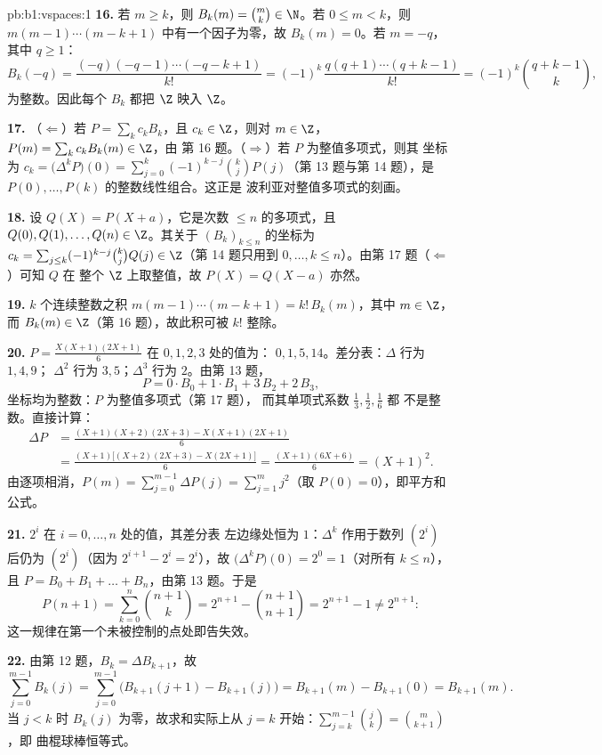 \begin{solution}{pb:b1:vspaces:1}
\textbf{16.} 若 $m \geq k$，则 $B_k(m) = \binom mk \in \N$。若 $0
\leq m < k$，则 $m(m-1)\cdots(m-k+1)$ 中有一个因子为零，故
$B_k(m) = 0$。若 $m = -q$，其中 $q \geq 1$：
\[
B_k(-q) = \frac{(-q)(-q-1)\cdots(-q-k+1)}{k!}
= (-1)^k\,\frac{q(q+1)\cdots(q+k-1)}{k!}
= (-1)^k \binom{q+k-1}{k},
\]
为整数。因此每个 $B_k$ 都把 $\Z$ 映入 $\Z$。

\textbf{17.} （$\Leftarrow$）若 $P = \sum_k c_k B_k$，且 $c_k \in
\Z$，则对 $m \in \Z$，$P(m) = \sum_k c_k B_k(m) \in \Z$，由
第 16 题。（$\Rightarrow$）若 $P$ 为整值多项式，则其
坐标为 $c_k = \bigl(\Delta^k P\bigr)(0) = \sum_{j=0}^k
(-1)^{k-j}\binom kj P(j)$（第 13 题与第 14 题），是
$P(0), \dots, P(k)$ 的整数线性组合。这正是
波利亚对整值多项式的刻画。

\textbf{18.} 设 $Q(X) = P(X + a)$，它是次数 $\leq
n$ 的多项式，且 $Q(0), Q(1), \dots, Q(n) \in \Z$。其关于
$(B_k)_{k \leq n}$ 的坐标为 $c_k = \sum_{j \leq k}(-1)^{k-j}\binom kj
Q(j) \in \Z$（第 14 题只用到 $0, \dots, k
\leq n$）。由第 17 题（$\Leftarrow$）可知 $Q$ 在
整个 $\Z$ 上取整值，故 $P(X) = Q(X - a)$ 亦然。

\textbf{19.} $k$ 个连续整数之积 $m(m-1)
\cdots(m-k+1) = k!\,B_k(m)$，其中 $m \in \Z$，而 $B_k(m) \in
\Z$（第 16 题），故此积可被 $k!$ 整除。

\textbf{20.} $P = \frac{X(X+1)(2X+1)}{6}$ 在 $0,1,2,3$ 处的值为：
$0, 1, 5, 14$。差分表：$\Delta$ 行为 $1, 4, 9$；
$\Delta^2$ 行为 $3, 5$；$\Delta^3$ 行为 $2$。由第 13 题，
\[
P = 0\cdot B_0 + 1\cdot B_1 + 3\,B_2 + 2\,B_3 ,
\]
坐标均为整数：$P$ 为整值多项式（第 17 题），
而其单项式系数 $\frac13, \frac12, \frac16$ 都
不是整数。直接计算：
\begin{align*}
\Delta P &= \frac{(X+1)(X+2)(2X+3) - X(X+1)(2X+1)}{6} \\
&= \frac{(X+1)\bigl[(X+2)(2X+3) - X(2X+1)\bigr]}{6}
= \frac{(X+1)(6X+6)}{6} = (X+1)^2 .
\end{align*}
由逐项相消，$P(m) = \sum_{j=0}^{m-1}\Delta P(j) = \sum_{j=1}^{m}
j^2$（取 $P(0) = 0$），即平方和公式。

\textbf{21.} $2^i$ 在 $i = 0, \dots, n$ 处的值，其差分表
左边缘处恒为 $1$：$\Delta^k$ 作用于数列
$(2^i)$ 后仍为 $(2^i)$（因为 $2^{i+1} - 2^i = 2^i$），故
$\bigl(\Delta^k P\bigr)(0) = 2^0 = 1$（对所有 $k \leq n$），且 $P =
B_0 + B_1 + \dots + B_n$，由第 13 题。于是
\[
P(n+1) = \sum_{k=0}^{n}\binom{n+1}{k}
= 2^{n+1} - \binom{n+1}{n+1} = 2^{n+1} - 1 \neq 2^{n+1}:
\]
这一规律在第一个未被控制的点处即告失效。

\textbf{22.} 由第 12 题，$B_k = \Delta B_{k+1}$，故
\[
\sum_{j=0}^{m-1} B_k(j)
= \sum_{j=0}^{m-1}\bigl(B_{k+1}(j+1) - B_{k+1}(j)\bigr)
= B_{k+1}(m) - B_{k+1}(0) = B_{k+1}(m).
\]
当 $j < k$ 时 $B_k(j)$ 为零，故求和实际上从
$j = k$ 开始：$\sum_{j=k}^{m-1}\binom jk = \binom m{k+1}$，即
曲棍球棒恒等式。


\end{solution}
